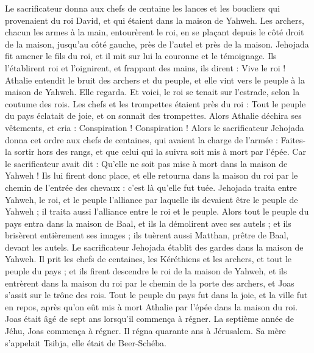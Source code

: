 \begin{multicols}{2}
Le sacrificateur donna aux chefs de centaine les lances et les boucliers qui provenaient du roi David, et qui étaient dans la maison de Yahweh.
Les archers, chacun les armes à la main, entourèrent le roi, en se plaçant depuis le côté droit de la maison, jusqu’au côté gauche, près de l’autel et près de la maison.
Jehojada fit amener le fils du roi, et il mit sur lui la couronne et le témoignage. Ils l’établirent roi et l’oignirent, et frappant des mains, ils dirent : Vive le roi !
Athalie entendit le bruit des archers et du peuple, et elle vint vers le peuple à la maison de Yahweh.
Elle regarda. Et voici, le roi se tenait sur l’estrade, selon la coutume des rois. Les chefs et les trompettes étaient près du roi : Tout le peuple du pays éclatait de joie, et on sonnait des trompettes. Alors Athalie déchira ses vêtements, et cria : Conspiration ! Conspiration !
Alors le sacrificateur Jehojada donna cet ordre aux chefs de centaines, qui avaient la charge de l’armée : Faites-la sortir hors des rangs, et que celui qui la suivra soit mis à mort par l’épée. Car le sacrificateur avait dit : Qu’elle ne soit pas mise à mort dans la maison de Yahweh !
Ils lui firent donc place, et elle retourna dans la maison du roi par le chemin de l’entrée des chevaux : c’est là qu’elle fut tuée.
Jehojada traita entre Yahweh, le roi, et le peuple l’alliance par laquelle ils devaient être le peuple de Yahweh ; il traita aussi l’alliance entre le roi et le peuple.
Alors tout le peuple du pays entra dans la maison de Baal, et ils la démolirent avec ses autels ; et ils brisèrent entièrement ses images ; ils tuèrent aussi Matthan, prêtre de Baal, devant les autels. Le sacrificateur Jehojada établit des gardes dans la maison de Yahweh.
Il prit les chefs de centaines, les Kéréthiens et les archers, et tout le peuple du pays ; et ils firent descendre le roi de la maison de Yahweh, et ils entrèrent dans la maison du roi par le chemin de la porte des archers, et Joas s’assit sur le trône des rois.
Tout le peuple du pays fut dans la joie, et la ville fut en repos, après qu’on eût mis à mort Athalie par l’épée dans la maison du roi.
Joas était âgé de sept ans lorsqu’il commença à régner.
\VerseOne{}La septième année de Jéhu, Joas commença à régner. Il régna quarante ans à Jérusalem. Sa mère s’appelait Tsibja, elle était de Beer-Schéba.

\end{multicols}
